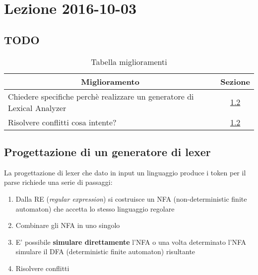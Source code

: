 \section{Lezione 2016-10-03}
\subsection{TODO}
\begin{table}[ht]
\begin{center}
\begin{tabular}{|p{\textwidth}|c|}
\hline
\multicolumn{1}{|c|}{\textbf{Miglioramento}} & \textbf{Sezione} \\ \hline
Chiedere specifiche perchè realizzare un generatore di Lexical Analyzer
& \ref{sec:lexer_generatore} \\ \hline
Risolvere conflitti cosa intente? & \ref{sec:lexer_generatore} \\ \hline
\end{tabular}
\end{center}
\caption{Tabella miglioramenti}
\label{tab:tab_todo}
\end{table}

\subsection{Progettazione di un generatore di lexer}
\label{sec:lexer_generatore}
La progettazione di lexer che dato in input un linguaggio produce i token per il
parse richiede una serie di passaggi:
\begin{enumerate}
\item Dalla RE (\textit{regular expression}) si costruisce un NFA
(non-deterministic finite automaton) che accetta lo stesso linguaggio regolare
\item Combinare gli NFA in uno singolo
\item E' possibile \textbf{simulare direttamente} l'NFA o una volta determinato
l'NFA simulare il DFA (deterministic finite automaton) risultante
\item Risolvere conflitti
\end{enumerate}

